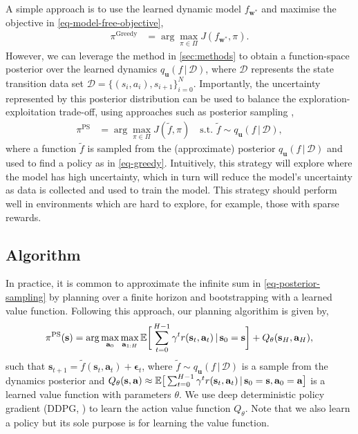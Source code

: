 \documentclass{article} %
\newcommand{\state}{\ensuremath{\mathbf{s}}}
\newcommand{\action}{\ensuremath{\mathbf{a}}}
\newcommand{\noise}{\ensuremath{\bm\epsilon}}
\newcommand{\dataset}{\ensuremath{\mathcal{D}}}
\newcommand{\Horizon}{\ensuremath{H}}
\newcommand{\transitionFn}{\ensuremath{f}}
\newcommand{\policy}{\ensuremath{\pi}}
\renewcommand{\mid}{\,|\,}
\begin{document}
A simple approach is to use the learned dynamic model $f_{\mathbf{w}^{*}}$ and maximise the objective in \cref{eq-model-free-objective},
\begin{align} \label{eq-greedy}
  \policy^{\text{Greedy}} &= \arg \max_{\pi \in \Pi} J(f_{\mathbf{w}^{*}}, \pi).
\end{align}
However, we can leverage the method in \cref{sec:methods} to obtain a function-space posterior over the learned dynamics $q_{\mathbf{u}}(\transitionFn \mid \dataset)$,
where $\mathcal{D}$ represents the state transition data set \(\mathcal{D} = \{(s_{i},a_{i}), s_{i+1}\}_{i=0}^{N}\).
Importantly, the uncertainty represented by this posterior distribution can be used to balance the exploration-exploitation trade-off,
using approaches such as posterior sampling \cite{osbandWhyPosteriorSampling2017,osbandMoreEfficientReinforcement2013},
\begin{align} \label{eq-posterior-sampling}
  \policy^{\text{PS}} &= \arg \max_{\pi \in \Pi} J(\tilde{f}, \pi)
\quad \text{s.t. } \tilde{\transitionFn} \sim q_{\mathbf{u}}({\transitionFn} \mid \dataset),
\end{align}
where a function $\tilde{\transitionFn}$ is sampled from the (approximate) posterior $q_{\mathbf{u}}({\transitionFn} \mid \dataset)$ and used to find a policy as
in \cref{eq-greedy}.
Intuitively, this strategy will explore where the model has high uncertainty, which in turn will reduce the model's uncertainty as data is collected and used to
train the model.
This strategy should perform well in environments which are hard to explore, for example, those
with sparse rewards.

\subsection{Algorithm}
In practice, it is common to approximate the infinite sum in \cref{eq-posterior-sampling}
by planning over a finite
horizon and bootstrapping with a learned value function.
Following this approach, our planning algorithim is given by,
\begin{equation} \label{eq-fast-update-mpc}
  \policy^{\text{PS}}(\state) = \arg \max_{\action_{0}} \max_{\action_{1:\Horizon}}
\E \bigg[ \sum_{t=0}^{H-1} \gamma^{t} r(\state_{t},\action_{t}) \mid \state_{0}=\state  \bigg] + Q_{\theta}(\state_{\Horizon}, \action_{H}),
\end{equation}
such that $\state_{t+1} = \tilde{\transitionFn}(\state_{t}, \action_{t}) + \noise_{t}$,
where $\tilde{\transitionFn} \sim q_{\mathbf{u}}(\transitionFn \mid \dataset)$ is a sample from the dynamics posterior and
${Q_{\theta}(\state, \action) \approx \E \big[ \sum_{t=0}^{H-1} \gamma^{t} r(\state_{t},\action_{t}) \mid \state_{0}=\state, \action_{0}=\action  \big]}$
is a learned value function with parameters $\theta$.
We use deep deterministic policy gradient (DDPG, \cite{lillicrapContinuousControlDeep2016}) to learn the action value function $Q_{\theta}$.
Note that we also learn a policy but its sole purpose is for learning the value function.
\end{document}

